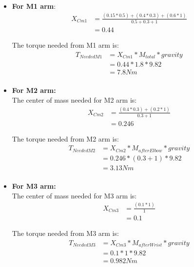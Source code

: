 \begin{enumerate}
\begin{itemize}
\item \textbf{For M1 arm}: 
\begin{equation} \label{eq: X_Cm1}
\begin{split}
X_{Cm1} & = \frac{(0.15*0.5) + (0.4*0.3) + (0.6*1)}{0.5 + 0.3 +1} \\
& = 0.44
\end{split}
\end{equation}


 
The torque needed from M1 arm is:
\begin{equation} \label{eq: T_M1}
\begin{split}
T_{NeededM1} & = X_{Cm1} *  M_{total} * gravity\\
& = 0.44 * 1.8 * 9.82\\
& = 7.8 Nm\\
\end{split}
\end{equation}

\item \textbf{For M2 arm:} \\
The center of mass needed for M2 arm is:
\begin{equation} \label{eq: X_Cm2}
\begin{split}
X_{Cm2} & = \frac{(0.4*0.3) + (0.2*1) }{0.3 + 1}  \\
& = 0.246
\end{split}
\end{equation}

The torque needed from M2 arm is:
\begin{equation} \label{eq: T_M2}
\begin{split}
T_{NeededM2} & = X_{Cm2}*  M_{afterElbow} * gravity\\
& = 0.246 * (0.3+1) * 9.82\\
& = 3.13 Nm\\
\end{split}
\end{equation}

\item \textbf{For M3 arm:} \\
The center of mass needed for M3 arm is:
\begin{equation} \label{eq: X_Cm3}
\begin{split}
X_{Cm3} & = \frac{(0.1*1)}{1} \\
&= 0.1
\end{split}
\end{equation}

The torque needed from M3 arm is:
\begin{equation} \label{eq: T_M3}
\begin{split}
T_{NeededM3} & = X_{Cm3} *  M_{afterWrist} * gravity\\
& = 0.1 * 1 * 9.82\\
& = 0.982 Nm\\
\end{split}
\end{equation}


\end{itemize}
\end{enumerate}
